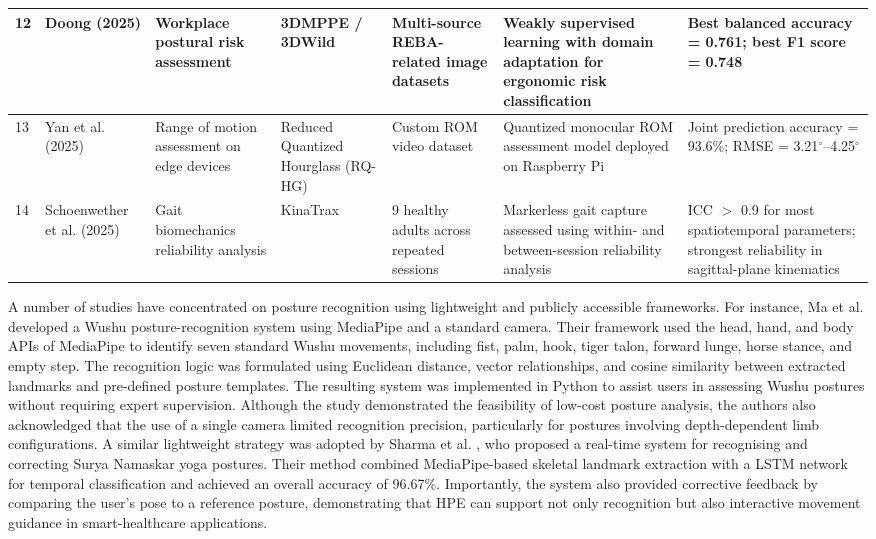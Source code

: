 \documentclass[12pt]{elsarticle}
\begin{document}
{\begin{center}
\begin{longtable}{m{0.7cm} m{2.2cm} m{2.2cm} m{2.0cm} m{2.1cm} m{3.0cm} m{2.8cm}}
12 & Doong (2025) \cite{doong2025predicting} 
& Workplace postural risk assessment 
& 3DMPPE / 3DWild 
& Multi-source REBA-related image datasets 
& Weakly supervised learning with domain adaptation for ergonomic risk classification 
& Best balanced accuracy = 0.761; best F1 score = 0.748 \\ \hline

13 & Yan et al. (2025) \cite{yan2025efficient} 
& Range of motion assessment on edge devices 
& Reduced Quantized Hourglass (RQ-HG) 
& Custom ROM video dataset 
& Quantized monocular ROM assessment model deployed on Raspberry Pi 
& Joint prediction accuracy = 93.6\%; RMSE = 3.21$^\circ$--4.25$^\circ$ \\ \hline

14 & Schoenwether et al. (2025) \cite{schoenwether2025reliability} 
& Gait biomechanics reliability analysis 
& KinaTrax 
& 9 healthy adults across repeated sessions 
& Markerless gait capture assessed using within- and between-session reliability analysis 
& ICC $>$ 0.9 for most spatiotemporal parameters; strongest reliability in sagittal-plane kinematics \\ \hline

\end{longtable}
\end{center}
}

A number of studies have concentrated on posture recognition using lightweight and publicly accessible frameworks. For instance, Ma et al. \cite{ma2022wushu} developed a Wushu posture-recognition system using MediaPipe and a standard camera. Their framework used the head, hand, and body APIs of MediaPipe to identify seven standard Wushu movements, including fist, palm, hook, tiger talon, forward lunge, horse stance, and empty step. The recognition logic was formulated using Euclidean distance, vector relationships, and cosine similarity between extracted landmarks and pre-defined posture templates. The resulting system was implemented in Python to assist users in assessing Wushu postures without requiring expert supervision. Although the study demonstrated the feasibility of low-cost posture analysis, the authors also acknowledged that the use of a single camera limited recognition precision, particularly for postures involving depth-dependent limb configurations. A similar lightweight strategy was adopted by Sharma et al. \cite{sharma2022surya}, who proposed a real-time system for recognising and correcting Surya Namaskar yoga postures. Their method combined MediaPipe-based skeletal landmark extraction with a LSTM network for temporal classification and achieved an overall accuracy of 96.67\%. Importantly, the system also provided corrective feedback by comparing the user’s pose to a reference posture, demonstrating that HPE can support not only recognition but also interactive movement guidance in smart-healthcare applications.
\end{document}
